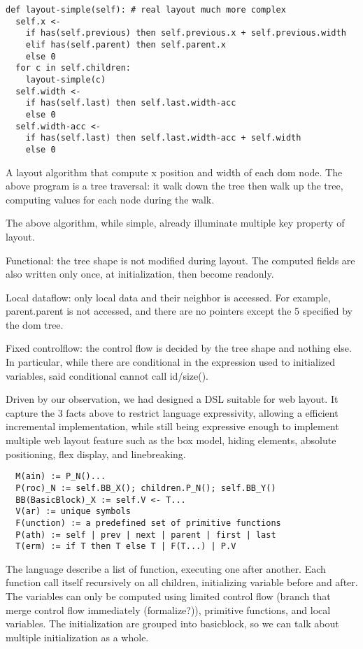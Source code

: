 \documentclass[format=acmsmall, review=false, screen=true]{acmart}
\begin{document}
\begin{verbatim}
def layout-simple(self): # real layout much more complex
  self.x <-
    if has(self.previous) then self.previous.x + self.previous.width
    elif has(self.parent) then self.parent.x
    else 0
  for c in self.children:
    layout-simple(c)
  self.width <-
    if has(self.last) then self.last.width-acc 
    else 0
  self.width-acc <-
    if has(self.last) then self.last.width-acc + self.width 
    else 0
\end{verbatim}
A layout algorithm that compute x position and width of each dom node. The above program is a tree traversal: it walk down the tree then walk up the tree, computing values for each node during the walk.

The above algorithm, while simple, already illuminate multiple key property of layout.

Functional: the tree shape is not modified during layout. The computed fields are also written only once, at initialization, then become readonly.

Local dataflow: only local data and their neighbor is accessed. For example, parent.parent is not accessed, and there are no pointers except the 5 specified by the dom tree. 

Fixed controlflow: the control flow is decided by the tree shape and nothing else. In particular, while there are conditional in the expression used to initialized variables, said conditional cannot call id/size().

Driven by our observation, we had designed a DSL suitable for web layout. It capture the 3 facts above to restrict language expressivity, allowing a efficient incremental implementation, while still being expressive enough to implement multiple web layout feature such as the box model, hiding elements, absolute positioning, flex display, and linebreaking.

\begin{verbatim}
  M(ain) := P_N()...
  P(roc)_N := self.BB_X(); children.P_N(); self.BB_Y()
  BB(BasicBlock)_X := self.V <- T... 
  V(ar) := unique symbols
  F(unction) := a predefined set of primitive functions
  P(ath) := self | prev | next | parent | first | last
  T(erm) := if T then T else T | F(T...) | P.V
\end{verbatim}

The language describe a list of function, executing one after another. Each function call itself recursively on all children, initializing variable before and after. The variables can only be computed using limited control flow (branch that merge control flow immediately (formalize?)), primitive functions, and local variables. The initialization are grouped into basicblock, so we can talk about multiple initialization as a whole.
\end{document}
